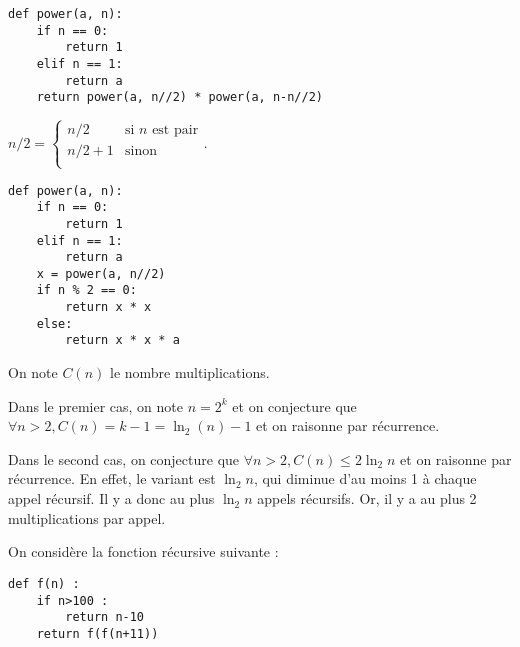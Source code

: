 \begin{multicols}{2}
\exer{}
\setcounter{numques}{0}

\ifprof
\begin{corrige}
\begin{lstlisting}
def power(a, n):
    if n == 0:
        return 1
    elif n == 1:
        return a
    return power(a, n//2) * power(a, n-n//2)
\end{lstlisting}
\end{corrige}
\else
\fi

$n/2 = \left\{ 
\begin{array}{ll} 
n/2 & \text{si }n \text{ est pair} \\
n/2+1 & \text{sinon}\\
\end{array}
\right.
$.
\ifprof
\begin{corrige}
\begin{lstlisting}
def power(a, n):
    if n == 0:
        return 1
    elif n == 1:
        return a
    x = power(a, n//2)
    if n % 2 == 0:
        return x * x
    else:
        return x * x * a
\end{lstlisting}
\end{corrige}
\else
\fi


\ifprof
\begin{corrige}
On note $C(n)$ le nombre multiplications.

Dans le premier cas, on note $n=2^k$ et on conjecture que $\forall n>2, C(n)=k-1=\ln_2 (n)-1$ et on raisonne par 
récurrence.

Dans le second cas, on conjecture que $\forall n>2, C(n)\leq 2\ln_2 n$ et on raisonne par récurrence. En effet, le 
variant est $\ln_2 n$, qui diminue d'au moins 1 à chaque appel récursif. Il y a donc au plus $\ln_2 n$ appels 
récursifs. Or, il y a au plus 2 multiplications par appel.
\end{corrige}
\else
\fi




\setcounter{numques}{0}


On considère la fonction récursive suivante : 
\begin{py}
\begin{lstlisting}
def f(n) :
    if n>100 : 
        return n-10
    return f(f(n+11))
\end{lstlisting}
\end{py}


\end{multicols}
